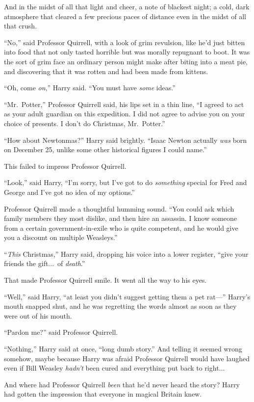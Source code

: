 And in the midst of all that light and cheer, a note of blackest night; a cold, dark atmosphere that cleared a few precious paces of distance even in the midst of all that crush.

“No,” said Professor Quirrell, with a look of grim revulsion, like he’d just bitten into food that not only tasted horrible but was morally repugnant to boot. It was the sort of grim face an ordinary person might make after biting into a meat pie, and discovering that it was rotten and had been made from kittens.

“Oh, come \emph{on},” Harry said. “You must have \emph{some} ideas.”

“Mr.~Potter,” Professor Quirrell said, his lips set in a thin line, “I agreed to act as your adult guardian on this expedition. I did not agree to advise you on your choice of presents. I don’t do Christmas, Mr.~Potter.”

“How about Newtonmas?” Harry said brightly. “Isaac Newton actually \emph{was} born on December 25\Th, unlike some other historical figures I could name.”

This failed to impress Professor Quirrell.

“Look,” said Harry, “I’m sorry, but I’ve got to do \emph{something} special for Fred and George and I’ve got no idea of my options.”

Professor Quirrell made a thoughtful humming sound. “You could ask which family members they most dislike, and then hire an assassin. I know someone from a certain government-in-exile who is quite competent, and he would give you a discount on multiple Weasleys.”

“\emph{This} Christmas,” Harry said, dropping his voice into a lower register, “give your friends the gift...\ of \emph{death}.”

That made Professor Quirrell smile. It went all the way to his eyes.

“Well,” said Harry, “at least you didn’t suggest getting them a pet rat—” Harry’s mouth snapped shut, and he was regretting the words almost as soon as they were out of his mouth.

“Pardon me?” said Professor Quirrell.

“Nothing,” Harry said at once, “long dumb story.” And telling it seemed wrong somehow, maybe because Harry was afraid Professor Quirrell would have laughed even if Bill Weasley \emph{hadn’t} been cured and everything put back to right...

And where had Professor Quirrell \emph{been} that he’d never heard the story? Harry had gotten the impression that everyone in magical Britain knew.

